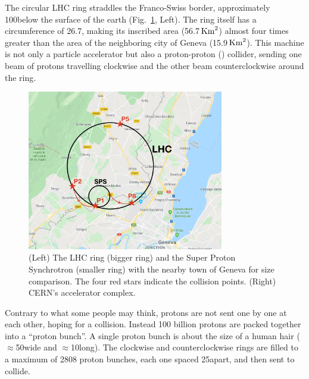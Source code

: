 The circular LHC ring straddles the Franco-Swiss border, approximately 100\meter below the surface of the earth (Fig.~\ref{fig:lhc_and_boosters}, Left).
The ring itself has a circumference of 26.7\Km, making its inscribed area (56.7$\,\text{Km}^{2}$) almost four times greater than the area of the neighboring city of Geneva (15.9$\,\text{Km}^{2}$).
This machine is not only a particle accelerator but also a proton-proton (\pp) collider, sending one beam of protons travelling clockwise and the other beam counterclockwise around the ring. 
\begin{figure}[pbth]
\centering
\includegraphics[height=7cm,keepaspectratio]{figures/lhc/lhc_drawn_on_map_withpoints.png}
    \caption{
    (Left) The LHC ring (bigger ring) and the Super Proton Synchrotron (smaller ring) with the nearby town of Geneva for size comparison. 
    The four red stars indicate the \pp collision points. 
    (Right) CERN's accelerator complex.
    } 
    \label{fig:lhc_and_boosters}
\end{figure}

Contrary to what some people may think, protons are not sent one by one at each other, hoping for a collision.
Instead 100 billion protons are packed together into a ``proton bunch''.
A single proton bunch is about the size of a human hair ($\approx$50\mum wide and $\approx$10\cm long). 
The clockwise and counterclockwise rings are filled to a maximum of 2808 proton bunches, each one spaced 25\ns apart, and then sent to collide. 

